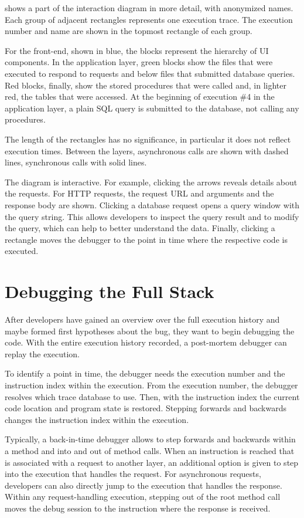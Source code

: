  shows a part of the interaction diagram in more detail, with anonymized names.
Each group of adjacent rectangles represents one execution trace.
The execution number and name are shown in the topmost rectangle of each group.

For the front-end, shown in blue, the blocks represent the hierarchy of UI components.
In the application layer, green blocks show the files that were executed to respond to requests and below files that submitted database queries.
Red blocks, finally, show the stored procedures that were called and, in lighter red, the tables that were accessed.
At the beginning of execution \#4 in the application layer, a plain SQL query is submitted to the database, not calling any procedures.

The length of the rectangles has no significance, in particular it does not reflect execution times.
Between the layers, asynchronous calls are shown with dashed lines, synchronous calls with solid lines.

The diagram is interactive.
For example, clicking the arrows reveals details about the requests.
For HTTP requests, the request URL and arguments and the response body are shown.
Clicking a database request opens a query window with the query string.
This allows developers to inspect the query result and to modify the query, which can help to better understand the data.
Finally, clicking a rectangle moves the debugger to the point in time where the respective code is executed.

\section{Debugging the Full Stack}

After developers have gained an overview over the full execution history and maybe formed first hypotheses about the bug, they want to begin debugging the code.
With the entire execution history recorded, a post-mortem debugger can replay the execution.

To identify a point in time, the debugger needs the execution number and the instruction index within the execution.
From the execution number, the debugger resolves which trace database to use.
Then, with the instruction index the current code location and program state is restored.
Stepping forwards and backwards changes the instruction index within the execution.

Typically, a back-in-time debugger allows to step forwards and backwards within a method and into and out of method calls.
When an instruction is reached that is associated with a request to another layer, 
an additional option is given to step into the execution that handles the request.
For asynchronous requests, developers can also directly jump to the execution that handles the response.
Within any request-handling execution, stepping out of the root method call moves the debug session to the instruction where the response is received.

